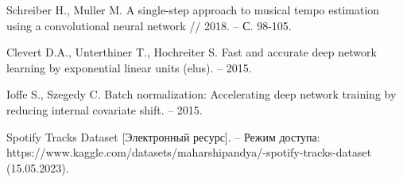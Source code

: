 \begin{thebibliography}{}
Schreiber H., Muller M. A single-step approach to musical tempo estimation using a convolutional neural network // 2018. -- С. 98-105.

Clevert D.A., Unterthiner T., Hochreiter S. Fast and accurate deep network learning by exponential linear units (elus). -- 2015.

Ioffe S., Szegedy C. Batch normalization: Accelerating deep network training by reducing internal covariate shift. -- 2015.

Spotify Tracks Dataset [Электронный ресурс]. -- Режим доступа: https://www.kaggle.com/datasets/maharshipandya/-spotify-tracks-dataset (15.05.2023).

\end{thebibliography}
\endgroup